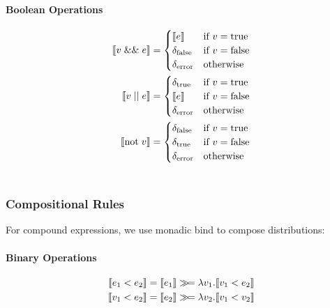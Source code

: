 \paragraph{Boolean Operations}
\begin{align*}
%
\sem{ v \logand e } & = \begin{cases}
	\sem{ e } & \text{if $v=\true$} \\
	\delta_{\text{false}} & \text{if $v=\false$} \\
	\delta_\error & \text{otherwise}
\end{cases} \\ 
%
%
\sem{ v \logor e } & = \begin{cases}
	\delta_\true & \text{if $v=\true$} \\
	\sem{ e } & \text{if $v=\false$} \\
	\delta_\error & \text{otherwise}
\end{cases} \\ 
%
%
\sem{ \text{not}\; v } &= 
 \begin{cases}
	\delta_\false & \text{if $v=\true$} \\
	\delta_\true & \text{if $v=\false$} \\
	\delta_\error & \text{otherwise}
\end{cases} \\ 
 \\
%
\end{align*}
%


\subsubsection{Compositional Rules}

For compound expressions, we use monadic bind to compose distributions:

\paragraph{Binary Operations}
\begin{align*}
\llbracket  e_1 < e_2  \rrbracket &= \llbracket  e_1  \rrbracket \gg\!= \lambda v_1. \llbracket  v_1 < e_2  \rrbracket \\
\llbracket  v_1 < e_2  \rrbracket &= \llbracket  e_2  \rrbracket \gg\!= \lambda v_2. \llbracket  v_1 < v_2  \rrbracket
\end{align*}

